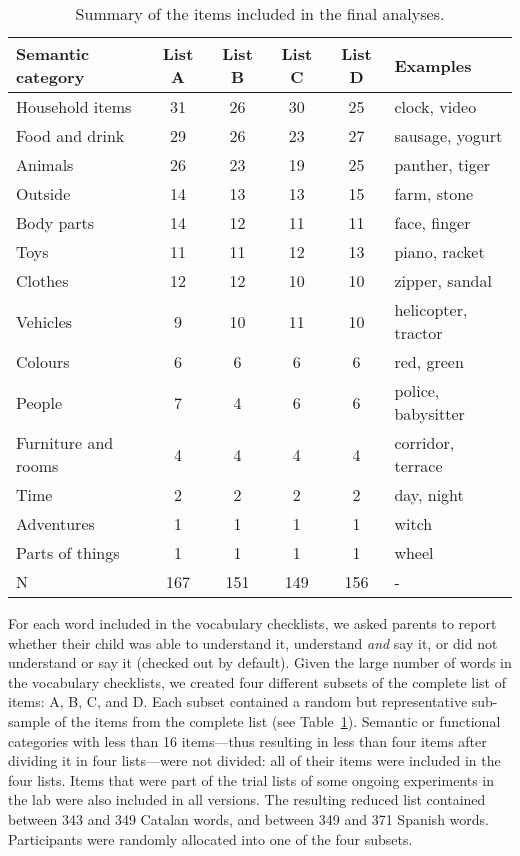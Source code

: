 \documentclass[
]{article}
\begin{document}
\hypertarget{tbl-items}{}
\begin{table}
\caption{\label{tbl-items}Summary of the items included in the final analyses. }\tabularnewline

\centering
\begin{tabular}{lccccl}
\toprule
Semantic category & List A & List B & List C & List D & Examples\\
\midrule
Household items & 31 & 26 & 30 & 25 & clock, video\\
Food and drink & 29 & 26 & 23 & 27 & sausage, yogurt\\
Animals & 26 & 23 & 19 & 25 & panther, tiger\\
Outside & 14 & 13 & 13 & 15 & farm, stone\\
Body parts & 14 & 12 & 11 & 11 & face, finger\\
\addlinespace
Toys & 11 & 11 & 12 & 13 & piano, racket\\
Clothes & 12 & 12 & 10 & 10 & zipper, sandal\\
Vehicles & 9 & 10 & 11 & 10 & helicopter, tractor\\
Colours & 6 & 6 & 6 & 6 & red, green\\
People & 7 & 4 & 6 & 6 & police, babysitter\\
\addlinespace
Furniture and rooms & 4 & 4 & 4 & 4 & corridor, terrace\\
Time & 2 & 2 & 2 & 2 & day, night\\
Adventures & 1 & 1 & 1 & 1 & witch\\
Parts of things & 1 & 1 & 1 & 1 & wheel\\
\midrule
N & 167 & 151 & 149 & 156 & -\\
\bottomrule
\end{tabular}
\end{table}

For each word included in the vocabulary checklists, we asked parents to
report whether their child was able to understand it, understand
\emph{and} say it, or did not understand or say it (checked out by
default). Given the large number of words in the vocabulary checklists,
we created four different subsets of the complete list of items: A, B,
C, and D. Each subset contained a random but representative sub-sample
of the items from the complete list (see Table~\ref{tbl-items}).
Semantic or functional categories with less than 16 items---thus
resulting in less than four items after dividing it in four lists---were
not divided: all of their items were included in the four lists. Items
that were part of the trial lists of some ongoing experiments in the lab
were also included in all versions. The resulting reduced list contained
between 343 and 349 Catalan words, and between 349 and 371 Spanish
words. Participants were randomly allocated into one of the four
subsets.
\end{document}
